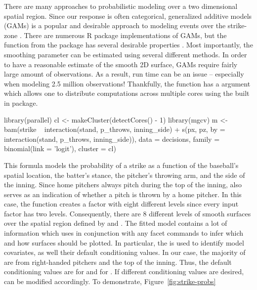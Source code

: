 \begin{article}
There are many approaches to probabilistic modeling over a two dimensional
spatial region. Since our response is often categorical, generalized
additive models (GAMs) is a popular and desirable approach to modeling
events over the strike-zone \citep{loess}. There are numerous R package
implementations of GAMs, but the  function from the 
package has several desirable properties \citep{mgcv}. Most importantly,
the smoothing parameter can be estimated using several different methods.
In order to have a reasonable estimate of the smooth 2D surface, GAMs
require fairly large amount of observations. As a result, run time
can be an issue -- especially when modeling 2.5 million observations!
Thankfully, the  function has a  argument
which allows one to distribute computations across multiple cores
using the built in  package.
%
\begin{Schunk}
\begin{Sinput}
library(parallel) 
cl <- makeCluster(detectCores() - 1)
library(mgcv) 
m <- bam(strike ~ interaction(stand, p_throws, inning_side) +                
  s(px, pz, by = interaction(stand, p_throws, inning_side)),              
  data = decisions, family = binomial(link = 'logit'), cluster = cl)
\end{Sinput}
\end{Schunk}
%
This formula models the probability of a strike as a function of the
baseball's spatial location, the batter's stance, the pitcher's throwing
arm, and the side of the inning. Since home pitchers always pitch
during the top of the inning,  also serves as
an indication of whether a pitch is thrown by a home pitcher. In this
case, the  function creates a factor with eight
different levels since every input factor has two levels. Consequently,
there are 8 different levels of smooth surfaces over the spatial region
defined by  and .
The fitted model  contains a lot of information which 
uses in conjunction with any  facet commands to infer
which and how surfaces should be plotted. In particular, the 
is used to identify model covariates, as well their default conditioning
values. In our case, the majority of  are from right-handed
pitchers and the top of the inning. Thus, the default conditioning
values are  for  and 
for . If different conditioning values are desired,
 can be modified accordingly. To demonstrate, Figure~\ref{fig:strike-probs}

\end{article}
